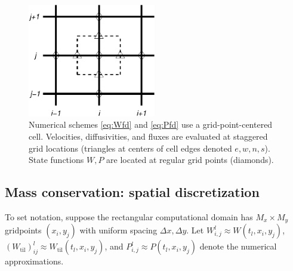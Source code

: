 \documentclass[gmd]{copernicus}   %
\newcommand{\text}{\textrm}
\newcommand{\Wtil}{W_{\text{til}}}
\newcommand{\Wlij}{W^l_{i,j}}
\newcommand{\Plij}{P^l_{i,j}}
\begin{document}
\begin{figure}[ht]
\centering
\includegraphics[width=2.2in,keepaspectratio=true]{diffstencil}
\bigskip
\caption{Numerical schemes \eqref{eq:Wfd} and \eqref{eq:Pfd} use a grid-point-centered cell.  Velocities, diffusivities, and fluxes are evaluated at staggered grid locations (triangles at centers of cell edges denoted $e,w,n,s$).  State functions $W,P$ are located at regular grid points (diamonds).}
\label{fig:stencil}
\end{figure}

\subsection{Mass conservation: spatial discretization}  To set notation, suppose the rectangular computational domain has $M_x \times M_y$ gridpoints $(x_i,y_j)$ with uniform spacing $\Delta x,\Delta y$.  Let $\Wlij \approx W(t_l,x_i,y_j)$, $(\Wtil)_{ij}^l \approx \Wtil(t_l,x_i,y_j)$, and $\Plij \approx P(t_l,x_i,y_j)$ denote the numerical approximations.
\end{document}
